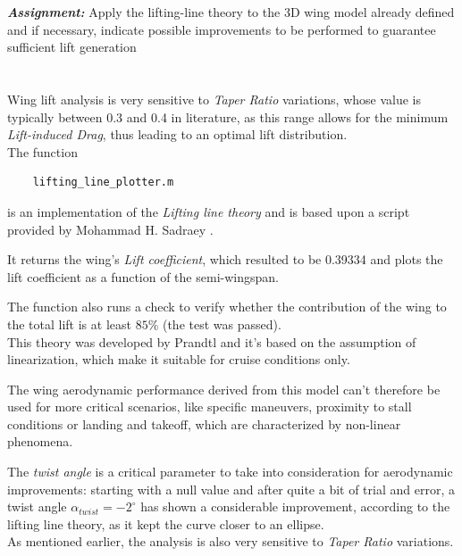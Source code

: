 \documentclass{article}
\begin{document}
\textbf{\textit{Assignment:}} Apply the lifting-line theory to the 3D wing model already defined
and if necessary, indicate possible improvements to be performed to guarantee sufficient lift generation \\ \\ \\ 

Wing lift analysis is very sensitive to \textit{Taper Ratio} variations, whose value is typically between 
0.3 and 0.4 in literature, as this range allows for the minimum \textit{Lift-induced Drag}, thus leading to 
an optimal lift distribution. \\ 

The function \autocite{Airbus_replacement_repo}

\begin{verbatim}
    lifting_line_plotter.m
\end{verbatim}

is an implementation of the \textit{Lifting line theory} and is based upon a script provided by Mohammad H. Sadraey \autocite{Sadraey_Mohammad}. 

It returns the wing's \textit{Lift coefficient}, which resulted to be 0.39334 and plots the lift coefficient as a function of the semi-wingspan.

The function also runs a check to verify whether the contribution of the wing to the total lift is at least $85 \%$ (the test was passed). \\ 

This theory was developed by Prandtl and it's based on the assumption of linearization, which make it suitable for cruise
conditions only. 

The wing aerodynamic performance derived from this model can't therefore be used for more critical scenarios, like
specific maneuvers, proximity to stall conditions or landing and takeoff, which are characterized by non-linear phenomena. \\ 



\clearpage

The \textit{twist angle} is a critical parameter to take into consideration for aerodynamic improvements:
starting with a null value and after quite a bit of trial and error, a twist angle $\alpha_{twist} = -2^{\circ}$ has shown
a considerable improvement, according to the lifting line theory, as it kept the curve closer to an 
ellipse.\\ 

As mentioned earlier, the analysis is also very sensitive to \textit{Taper Ratio} variations. 
\end{document}

